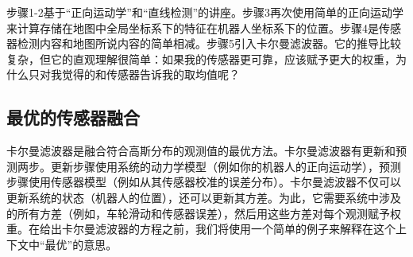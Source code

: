 
步骤1-2基于“正向运动学”和“直线检测”的讲座。步骤3再次使用简单的正向运动学来计算存储在地图中全局坐标系下的特征在机器人坐标系下的位置。步骤4是传感器检测内容和地图所说内容的简单相减。步骤5引入卡尔曼滤波器。它的推导比较复杂，但它的直观理解很简单：如果我的传感器更可靠，应该赋予更大的权重，为什么只对我觉得的和传感器告诉我的取均值呢？



\subsection{最优的传感器融合}
卡尔曼滤波器是融合符合高斯分布的观测值的最优方法。卡尔曼滤波器有更新和预测两步。更新步骤使用系统的动力学模型（例如你的机器人的正向运动学），预测步骤使用传感器模型（例如从其传感器校准的误差分布）。卡尔曼滤波器不仅可以更新系统的状态（机器人的位置），还可以更新其方差。为此，它需要系统中涉及的所有方差（例如，车轮滑动和传感器误差），然后用这些方差对每个观测赋予权重。在给出卡尔曼滤波器的方程之前，我们将使用一个简单的例子来解释在这个上下文中“最优”的意思。

